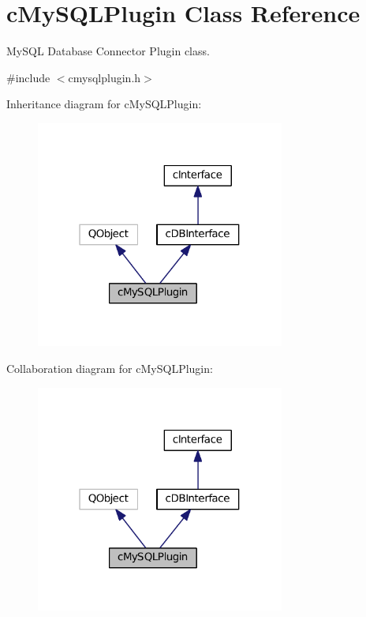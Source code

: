 \hypertarget{classc_my_s_q_l_plugin}{}\section{c\+My\+S\+Q\+L\+Plugin Class Reference}
\label{classc_my_s_q_l_plugin}


My\+S\+QL Database Connector Plugin class.  




{\ttfamily \#include $<$cmysqlplugin.\+h$>$}



Inheritance diagram for c\+My\+S\+Q\+L\+Plugin\+:
\nopagebreak
\begin{figure}[H]
\begin{center}
\leavevmode
\includegraphics[width=232pt]{classc_my_s_q_l_plugin__inherit__graph}
\end{center}
\end{figure}


Collaboration diagram for c\+My\+S\+Q\+L\+Plugin\+:
\nopagebreak
\begin{figure}[H]
\begin{center}
\leavevmode
\includegraphics[width=232pt]{classc_my_s_q_l_plugin__coll__graph}
\end{center}
\end{figure}
